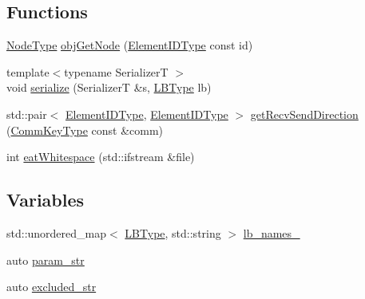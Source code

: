 \subsection*{Functions}
\begin{DoxyCompactItemize}
\item 
\hyperlink{namespacevt_a866da9d0efc19c0a1ce79e9e492f47e2}{Node\+Type} \hyperlink{namespacevt_1_1vrt_1_1collection_1_1balance_af20727e3c42016658b1abf7836ead728}{obj\+Get\+Node} (\hyperlink{namespacevt_1_1vrt_1_1collection_1_1balance_a14c8d2c972f2913aa3f1636e5be0a120}{Element\+I\+D\+Type} const id)
\item 
{\footnotesize template$<$typename SerializerT $>$ }\\void \hyperlink{namespacevt_1_1vrt_1_1collection_1_1balance_a783d95de203cabd0f599440e9869c313}{serialize} (SerializerT \&s, \hyperlink{namespacevt_1_1vrt_1_1collection_1_1balance_ac4f99693509affcc67db182d4aad9b5c}{L\+B\+Type} lb)
\item 
std\+::pair$<$ \hyperlink{namespacevt_1_1vrt_1_1collection_1_1balance_a14c8d2c972f2913aa3f1636e5be0a120}{Element\+I\+D\+Type}, \hyperlink{namespacevt_1_1vrt_1_1collection_1_1balance_a14c8d2c972f2913aa3f1636e5be0a120}{Element\+I\+D\+Type} $>$ \hyperlink{namespacevt_1_1vrt_1_1collection_1_1balance_a2d79bdb3acf651303e8a8a0b42d75d78}{get\+Recv\+Send\+Direction} (\hyperlink{namespacevt_1_1vrt_1_1collection_1_1balance_a01c9a1060d83d052604a3ff12918033a}{Comm\+Key\+Type} const \&comm)
\item 
int \hyperlink{namespacevt_1_1vrt_1_1collection_1_1balance_a605ea184edf7f99b0022f960f71bf4d4}{eat\+Whitespace} (std\+::ifstream \&file)
\end{DoxyCompactItemize}
\subsection*{Variables}
\begin{DoxyCompactItemize}
\item 
std\+::unordered\+\_\+map$<$ \hyperlink{namespacevt_1_1vrt_1_1collection_1_1balance_ac4f99693509affcc67db182d4aad9b5c}{L\+B\+Type}, std\+::string $>$ \hyperlink{namespacevt_1_1vrt_1_1collection_1_1balance_a25f2d26f8832c24be922ebbb2cd7c119}{lb\+\_\+names\+\_\+}
\item 
auto \hyperlink{namespacevt_1_1vrt_1_1collection_1_1balance_aaed7e09146a45c2932ca185a55161723}{param\+\_\+str}
\item 
auto \hyperlink{namespacevt_1_1vrt_1_1collection_1_1balance_af2f6674ecc7191ddbfe31e87569fe334}{excluded\+\_\+str}
\end{DoxyCompactItemize}



